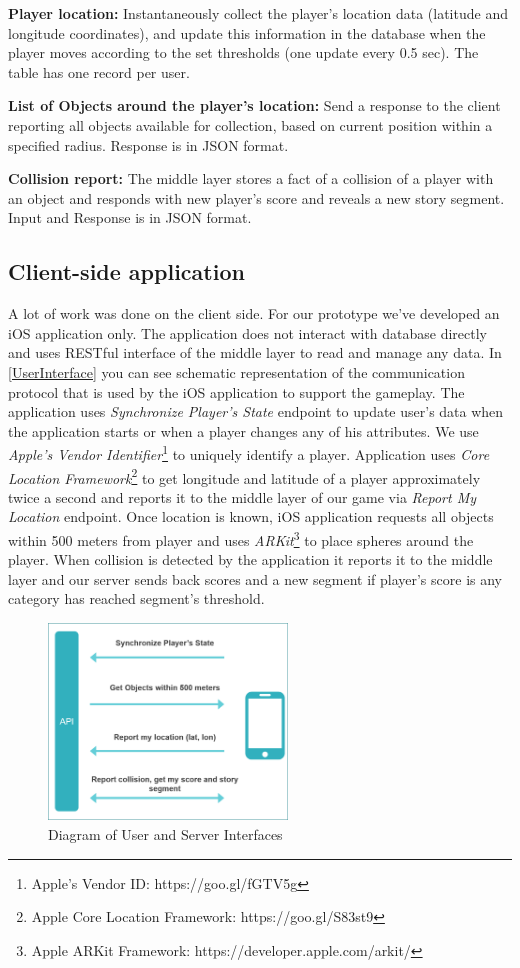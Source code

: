 \documentclass[conference]{IEEEtran}
\begin{document}
\textbf{Player location:} Instantaneously collect the player’s location data (latitude and longitude coordinates), and update this information in the database when the player moves according to the set thresholds (one update every 0.5 sec). The table has one record per user.

\textbf{List of Objects around the player’s location:} Send a response to the client reporting all objects available for collection, based on current position within a specified radius. Response is in JSON format.

\textbf{Collision report:} The middle layer stores a fact of a collision of a player with an object and responds with new player's score and reveals a new story segment. Input and Response is in JSON format.

\subsection{Client-side application}

A lot of work was done on the client side. For our prototype we’ve developed an iOS application only. The application does not interact with database directly and uses RESTful interface of the middle layer to read and manage any data. 
In \autoref{UserInterface} you can see schematic representation of the communication protocol that is used by the iOS application to support the gameplay. 
The application uses \textit{Synchronize Player’s State} endpoint to update user's data when the application starts or when a player changes any of his attributes. We use \textit{Apple's Vendor Identifier}\footnote[1]{Apple's Vendor ID: https://goo.gl/fGTV5g} to uniquely identify a player. 
Application uses \textit{Core Location Framework}\footnote[2]{Apple Core Location Framework: https://goo.gl/S83st9} to get longitude and latitude of a player approximately twice a second and reports it to the middle layer of our game via \textit{Report My Location} endpoint. 
Once location is known, iOS application requests all objects within 500 meters from player and uses \textit{ARKit}\footnote[3]{Apple ARKit Framework: https://developer.apple.com/arkit/} to place spheres around the player. When collision is detected by the application it reports it to the middle layer and our server sends back scores and a new segment if player's score is any category has reached segment's threshold.

\begin{figure}
\centering
\includegraphics[width=2.5in]{imgs/UserInterface.png}
\caption{Diagram of User and Server Interfaces}
\label{UserInterface}
\end{figure}
\end{document}
